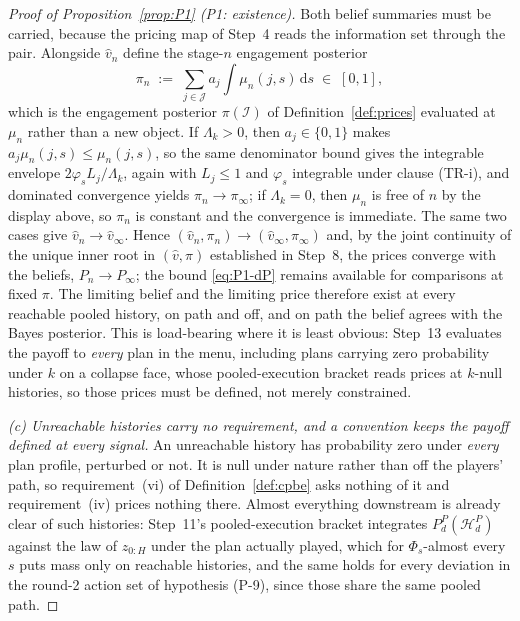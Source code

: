 \documentclass[11pt]{article}
\begin{document}
\begin{proof}[Proof of Proposition~\ref{prop:P1} (P1: existence)]
Both belief summaries must be carried, because the pricing map of Step~4 reads the information set
through the pair. Alongside $\hat v_n$ define the stage-$n$ engagement posterior
\[
\pi_n \;:=\; \sum_{j \in \mathcal J} a_j \int \mu_n(j,s)\,\mathrm{d}s \;\in\; [0,1],
\]
which is the engagement posterior $\pi(\mathcal I)$ of Definition~\ref{def:prices} evaluated at
$\mu_n$ rather than a new object. If $\Lambda_k > 0$, then $a_j \in \{0,1\}$ makes
$a_j\mu_n(j,s) \le \mu_n(j,s)$, so the same denominator bound gives the integrable envelope
$2\varphi_s L_j/\Lambda_k$, again with $L_j \le 1$ and $\varphi_s$ integrable under clause (TR-i),
and dominated convergence yields $\pi_n \to \pi_\infty$; if $\Lambda_k = 0$, then $\mu_n$ is free of
$n$ by the display above, so $\pi_n$ is constant and the convergence is immediate. The same two cases
give $\hat v_n \to \hat v_\infty$. Hence $(\hat v_n,\pi_n) \to (\hat v_\infty,\pi_\infty)$ and, by the
joint continuity of the unique inner root in $(\hat v,\pi)$ established in Step~8, the prices converge
with the beliefs, $P_n \to P_\infty$; the bound \eqref{eq:P1-dP} remains available for comparisons at
fixed $\pi$. The limiting belief and the limiting price therefore exist at every reachable pooled
history, on path and off, and on path the belief agrees with the Bayes posterior. This is
load-bearing where it is least obvious: Step~13 evaluates the payoff to \emph{every} plan in the
menu, including plans carrying zero probability under $k$ on a collapse face, whose pooled-execution
bracket reads prices at $k$-null histories, so those prices must be defined, not merely constrained.

\emph{(c) Unreachable histories carry no requirement, and a convention keeps the payoff defined at
every signal.} An unreachable history has probability zero under \emph{every} plan profile,
perturbed or not. It is null under nature rather than off the players' path, so requirement~(vi) of
Definition~\ref{def:cpbe} asks nothing of it and requirement~(iv) prices nothing there. Almost
everything downstream is already clear of such histories: Step~11's pooled-execution bracket
integrates $P_d^P(\mathcal H_d^P)$ against the law of $z_{0:H}$ under the plan actually played, which
for $\Phi_s$-almost every $s$ puts mass only on reachable histories, and the same holds for every
deviation in the round-2 action set of hypothesis (P-9), since those share the same pooled path.


\end{proof}
\end{document}

